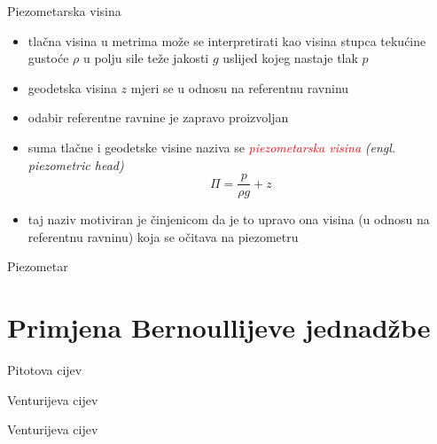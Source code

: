 \documentclass[croatian]{beamer}
\begin{document}
\begin{frame}{Piezometarska visina}

\begin{itemize}
\item tlačna visina u metrima može se interpretirati kao visina stupca tekućine
gustoće $\rho$ u polju sile teže jakosti $g$ uslijed kojeg nastaje
tlak $p$
\item geodetska visina $z$ mjeri se u odnosu na referentnu ravninu
\item odabir referentne ravnine je zapravo proizvoljan
\item suma tlačne i geodetske visine naziva se \textcolor{red}{\emph{piezometarska
visina }}\emph{(engl. piezometric head)}
\[
\Pi=\frac{p}{\rho g}+z
\]
\item taj naziv motiviran je činjenicom da je to upravo ona visina (u odnosu
na referentnu ravninu) koja se očitava na piezometru
\end{itemize}
\end{frame}

\begin{frame}{Piezometar}

\begin{figure}
\end{figure}
\end{frame}

\section{Primjena Bernoullijeve jednadžbe}

\begin{frame}{Pitotova cijev}

\begin{figure}
\end{figure}
\end{frame}

\begin{frame}{Venturijeva cijev}

\begin{figure}
\end{figure}
\end{frame}

\begin{frame}{Venturijeva cijev}

\begin{figure}
\end{figure}
\end{frame}
\end{document}
